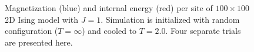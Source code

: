 \documentclass{article}
\begin{document}
\begin{figure}
\hspace{0mm}
\caption{Magnetization (blue) and internal energy (red) per site of $100 \times 100$
2D Ising model with $J=1$. Simulation is initialized with random configuration
($T = \infty$) and cooled to $T=2.0$. Four separate trials are presented here.}
\end{figure}
\end{document}
